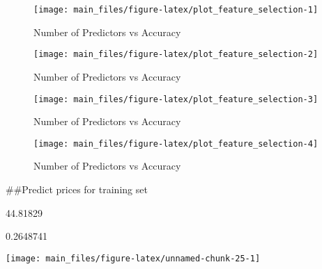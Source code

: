 \begin{Schunk}
\begin{figure}[H]

{\centering \texttt{[image: main\_files/figure-latex/plot\_feature\_selection-1]} 

}

\caption[Number of Predictors vs Accuracy]{Number of Predictors vs Accuracy}\label{fig:plot_feature_selection1}
\end{figure}
\begin{figure}[H]

{\centering \texttt{[image: main\_files/figure-latex/plot\_feature\_selection-2]} 

}

\caption[Number of Predictors vs Accuracy]{Number of Predictors vs Accuracy}\label{fig:plot_feature_selection2}
\end{figure}
\begin{figure}[H]

{\centering \texttt{[image: main\_files/figure-latex/plot\_feature\_selection-3]} 

}

\caption[Number of Predictors vs Accuracy]{Number of Predictors vs Accuracy}\label{fig:plot_feature_selection3}
\end{figure}
\begin{figure}[H]

{\centering \texttt{[image: main\_files/figure-latex/plot\_feature\_selection-4]} 

}

\caption[Number of Predictors vs Accuracy]{Number of Predictors vs Accuracy}\label{fig:plot_feature_selection4}
\end{figure}
\end{Schunk}

\#\#Predict prices for training set

\begin{Schunk}
\begin{Soutput}
[1] 44.81829
\end{Soutput}
\begin{Soutput}
[1] 0.2648741
\end{Soutput}
\end{Schunk}

\begin{Schunk}


\begin{center}\texttt{[image: main\_files/figure-latex/unnamed-chunk-25-1]} \end{center}

\end{Schunk}

